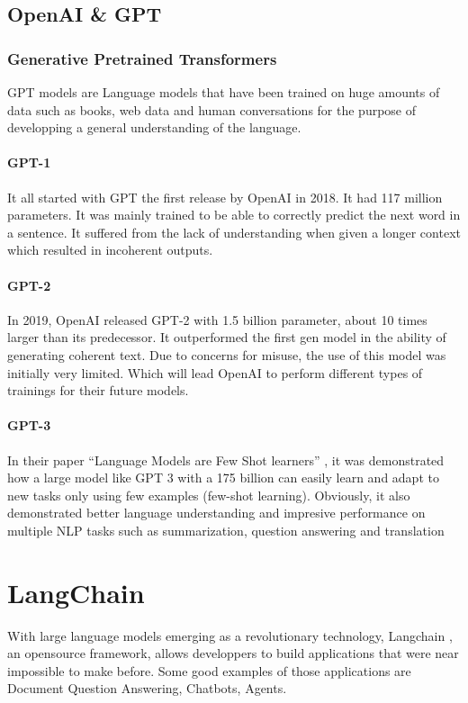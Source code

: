 \documentclass[a4paper,12pt,twoside]{report}
\begin{document}
\subsection{OpenAI \& GPT}
\subsubsection{Generative Pretrained Transformers}
GPT models are Language models that have been trained on huge amounts of data such as books, web data and human conversations for the purpose of developping a general understanding of the language. 
\paragraph{GPT-1}
It all started with GPT the first release by OpenAI \cite{openai} in 2018. It had 117 million parameters. It was mainly trained to be able to correctly predict the next word in a sentence. It suffered from the lack of understanding when given a longer context which resulted in incoherent outputs.
\paragraph{GPT-2}
In 2019, OpenAI released GPT-2 with 1.5 billion parameter, about 10 times larger than its predecessor. It outperformed the first gen model in the ability of generating coherent text. Due to concerns for misuse, the use of this model was initially very limited. Which will lead OpenAI to perform different types of trainings for their future models.
\paragraph{GPT-3}
In their paper ``Language Models are Few Shot learners'' \cite{brown2020language}, it was demonstrated how a large model like GPT 3 with a 175 billion can easily learn and adapt to new tasks only using few examples (few-shot learning). Obviously, it also demonstrated better language understanding and impresive performance on multiple NLP tasks such as summarization, question answering and translation
\section{LangChain}\label{langchainSec}
With large language models emerging as a revolutionary technology, Langchain \cite{langchain}, an opensource framework, allows developpers to build applications that were near impossible to make before. Some good examples of those applications are Document Question Answering, Chatbots, Agents.
\end{document}
